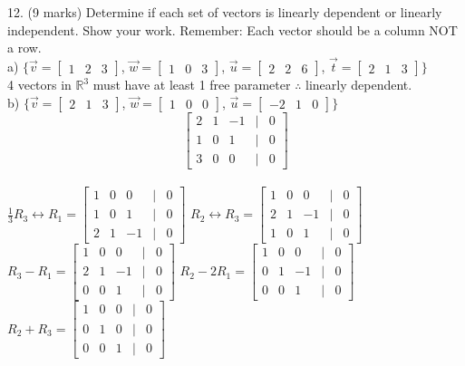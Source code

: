 \documentclass[a4paper]{article}
\begin{document}
12. (9 marks) Determine if each set of vectors is linearly dependent or linearly independent. Show your work. Remember: Each vector should be a column NOT a row.\\
a) $\{\vec{v} = \begin{bmatrix}
1&2&3
\end{bmatrix}$, $\vec{w} = \begin{bmatrix}
1&0&3
\end{bmatrix}$, $\vec{u} = \begin{bmatrix}
2&2&6
\end{bmatrix}$, $\vec{t} = \begin{bmatrix}
2&1&3
\end{bmatrix}\}$\\
4 vectors in $\mathbb{R}^3$ must have at least 1 free parameter $\therefore$ linearly dependent.\\
b) $\{\vec{v} = \begin{bmatrix}
2&1&3
\end{bmatrix}$, $\vec{w} = \begin{bmatrix}
1&0&0
\end{bmatrix}$, $\vec{u} = \begin{bmatrix}
-2&1&0
\end{bmatrix}\}$\\
$$\begin{bmatrix}
2&1&-1&|&0\\
1&0&1&|&0\\
3&0&0&|&0
\end{bmatrix}$$\\$\frac{1}{3}R_3 \leftrightarrow R_1 = \begin{bmatrix}
1&0&0&|&0\\
1&0&1&|&0\\
2&1&-1&|&0
\end{bmatrix}$ $R_2 \leftrightarrow R_3 = \begin{bmatrix}
1&0&0&|&0\\
2&1&-1&|&0\\
1&0&1&|&0
\end{bmatrix}$\\
$R_3 - R_1 = \begin{bmatrix}
1&0&0&|&0\\
2&1&-1&|&0\\
0&0&1&|&0
\end{bmatrix}$ $R_2 - 2R_1 = \begin{bmatrix}
1&0&0&|&0\\
0&1&-1&|&0\\
0&0&1&|&0
\end{bmatrix}$ $R_2 + R_3 = \begin{bmatrix}
1&0&0&|&0\\
0&1&0&|&0\\
0&0&1&|&0
\end{bmatrix}$\\
\end{document}
